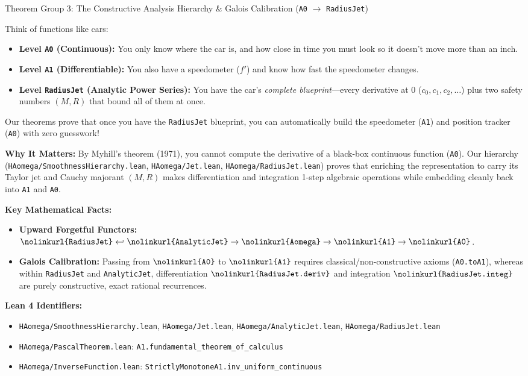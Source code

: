 \documentclass[11pt,a4paper]{article}
\newcommand{\lean}[1]{\texttt{\nolinkurl{#1}}}
\begin{document}
\vspace{6pt}

\begin{thmcard}{Theorem Group 3: The Constructive Analysis Hierarchy \& Galois Calibration (\lean{A0} \texorpdfstring{$\to$}{->} \lean{RadiusJet})}
\begin{eli5box}
Think of functions like cars:
\begin{itemize}
  \item \textbf{Level \lean{A0} (Continuous):} You only know where the car is, and how close in time you must look so it doesn't move more than an inch.
  \item \textbf{Level \lean{A1} (Differentiable):} You also have a speedometer ($f'$) and know how fast the speedometer changes.
  \item \textbf{Level \lean{RadiusJet} (Analytic Power Series):} You have the car's \emph{complete blueprint}---every derivative at $0$ ($c_0, c_1, c_2, \dots$) plus two safety numbers $(M, R)$ that bound all of them at once.
\end{itemize}
Our theorems prove that once you have the \lean{RadiusJet} blueprint, you can automatically build the speedometer (\lean{A1}) and position tracker (\lean{A0}) with zero guesswork!
\end{eli5box}

\textbf{Why It Matters:}
By Myhill's theorem (1971), you cannot compute the derivative of a black-box continuous function (\lean{A0}). Our hierarchy (\lean{HAomega/SmoothnessHierarchy.lean}, \lean{HAomega/Jet.lean}, \lean{HAomega/RadiusJet.lean}) proves that enriching the representation to carry its Taylor jet and Cauchy majorant $(M, R)$ makes differentiation and integration 1-step algebraic operations while embedding cleanly back into \lean{A1} and \lean{A0}.

\textbf{Key Mathematical Facts:}
\begin{itemize}
  \item \textbf{Upward Forgetful Functors:} $\lean{RadiusJet} \hookleftarrow \lean{AnalyticJet} \to \lean{Aomega} \to \lean{A1} \to \lean{A0}$.
  \item \textbf{Galois Calibration:} Passing from $\lean{A0}$ to $\lean{A1}$ requires classical/non-constructive axioms (\lean{A0.toA1}), whereas within \lean{RadiusJet} and \lean{AnalyticJet}, differentiation $\lean{RadiusJet.deriv}$ and integration $\lean{RadiusJet.integ}$ are purely constructive, exact rational recurrences.
\end{itemize}

\textbf{Lean 4 Identifiers:}
\begin{itemize}
  \item \lean{HAomega/SmoothnessHierarchy.lean}, \lean{HAomega/Jet.lean}, \lean{HAomega/AnalyticJet.lean}, \lean{HAomega/RadiusJet.lean}
  \item \lean{HAomega/PascalTheorem.lean}: \lean{A1.fundamental_theorem_of_calculus}
  \item \lean{HAomega/InverseFunction.lean}: \lean{StrictlyMonotoneA1.inv_uniform_continuous}
\end{itemize}
\end{thmcard}
\end{document}
